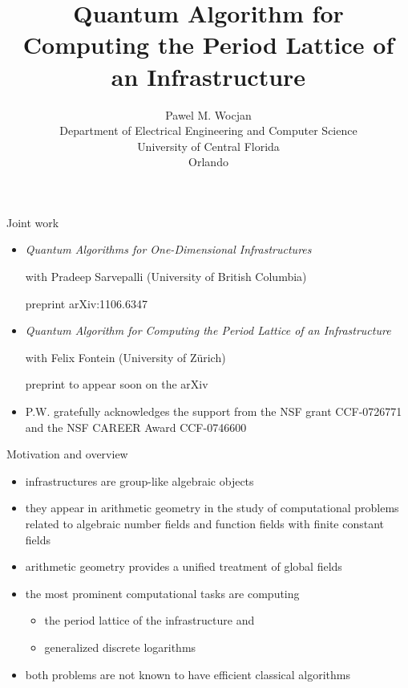 \documentclass[slideColor]{prosper}
\title{Quantum Algorithm for Computing the Period Lattice of an Infrastructure}
\author{Pawel M. Wocjan\\[1ex]Department of Electrical Engineering and Computer Science\\ University of Central Florida\\Orlando}
\renewcommand{\>}{\rangle}
\newcommand{\<}{\langle}
\begin{document}
\maketitle

\begin{slide}{Joint work}
\vspace{-0.2cm}
\begin{itemize}
\item \emph{Quantum Algorithms for One-Dimensional Infrastructures}

\medskip
with Pradeep Sarvepalli (University of British Columbia) 
 
\medskip
preprint arXiv:1106.6347

\bigskip
\item \emph{Quantum Algorithm for Computing the Period Lattice of an Infrastructure}
 
\medskip
with Felix Fontein (University of Z\"urich)
 
\medskip
preprint to appear soon on the arXiv

\bigskip
\item P.W. gratefully acknowledges the support from the NSF grant CCF-0726771 and the NSF CAREER Award CCF-0746600
\end{itemize}
\end{slide}


\begin{slide}{Motivation and overview}
\vspace{-0.3cm}
\begin{itemize}
\item infrastructures are group-like algebraic objects

\medskip
\item they appear in arithmetic geometry in the study of computational problems related to
algebraic number fields and function fields with finite constant fields

\medskip
\item arithmetic geometry provides a unified treatment of global fields 

\medskip
\item
the most prominent computational tasks are computing 

\begin{itemize}
\item the period lattice of the infrastructure and

\medskip
\item generalized discrete logarithms
\end{itemize}

\medskip
\item
both problems are not known to have efficient classical algorithms
\end{itemize}

\end{slide}
\end{document}
